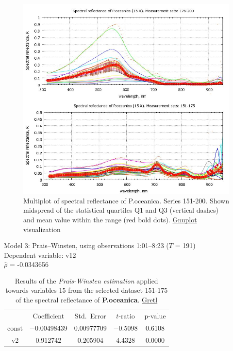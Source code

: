 \documentclass[10pt, a4paper]{article}
\begin{document}
\begin{appendices}
\begin{figure}[H]
	\begin{center}
		\includegraphics[scale=0.38]{GNU-15.jpg}
		\caption{Multiplot of spectral reflectance of P.oceanica. Series 151-200. Shown midspread of the statistical quartiles Q1 and Q3 (vertical dashes) and mean value within the range (red bold dots). \href{http://www.gnuplot.info/}{Gnuplot} visualization­}
		\label{fig:59}
	\end{center}
\end{figure}
\pagebreak

\begin{table}[H]
	\begin{center}
	\caption{Results of the \textit{Prais-Winsten estimation} applied towards variables 15 from the selected dataset 151-175 of the spectral reflectance of \textbf{P.oceanica}. \href{http://gretl.sourceforge.net/}{Gretl}}
	\label{tab:26}
		Model 3: Prais--Winsten, using observations 1:01--8:23 ($T$ = 191)\\
		Dependent variable: v12\\
	$\hat{\rho}$ = -0.0343656

	\vspace{1em}

	\begin{tabular}{|c c c c c|}
		  & {Coefficient} &  {Std.\ Error} & {$t$-ratio} &   {p-value} \\[1ex]
		const &   $-$0.00498439 &     0.00977709 &       $-$0.5098 &         0.6108 \\
		v2 &   0.912742 &     0.205904 &      4.4328 &         0.0000 \\
	\end{tabular}


\end{center}
\end{table}
\end{appendices}
\end{document}
